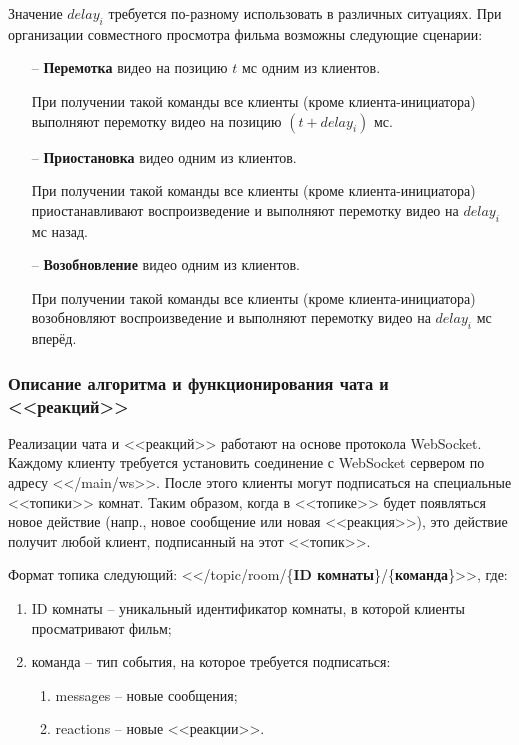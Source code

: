 \documentclass{../includes/TechDoc}
\begin{document}
	Значение \(delay_i\) требуется по-разному использовать в различных ситуациях.
	При организации совместного просмотра фильма возможны следующие сценарии:
	\begin{itemize}
	    \item[--] \textbf{Перемотка} видео на позицию \(t\) мс одним из клиентов.

	    При получении такой команды все клиенты (кроме клиента-инициатора) выполняют перемотку видео на позицию \((t + delay_i)\) мс.
	    \item[--] \textbf{Приостановка} видео одним из клиентов.

	    При получении такой команды все клиенты (кроме клиента-инициатора) приостанавливают воспроизведение и выполняют перемотку видео на \(delay_i\) мс назад.
	    \item[--] \textbf{Возобновление} видео одним из клиентов.

	    При получении такой команды все клиенты (кроме клиента-инициатора) возобновляют воспроизведение и выполняют перемотку видео на \(delay_i\) мс вперёд.
	\end{itemize}



	\subsubsection{Описание алгоритма и функционирования чата и <<реакций>>}

	Реализации чата и <<реакций>> работают на основе протокола WebSocket.
	Каждому клиенту требуется установить соединение с WebSocket сервером по адресу <</main/ws>>.
	После этого клиенты могут подписаться на специальные <<топики>> комнат.
	Таким образом, когда в <<топике>> будет появляться новое действие (напр., новое сообщение или новая <<реакция>>), это действие получит любой клиент, подписанный на этот <<топик>>.

	Формат топика следующий: <</topic/room/\{\textbf{ID комнаты}\}/\{\textbf{команда}\}>>, где:
	\begin{enumerate}
		\item ID комнаты -- уникальный идентификатор комнаты, в которой клиенты просматривают фильм;
		\item команда -- тип события, на которое требуется подписаться:
		\begin{enumerate}
			\item messages -- новые сообщения;
			\item reactions -- новые <<реакции>>.
		\end{enumerate}
	\end{enumerate}
\end{document}

